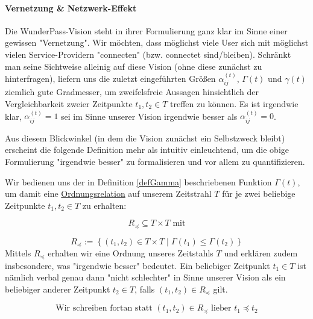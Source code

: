 \documentclass[11pt]{scrartcl}
\begin{document}
\paragraph{Vernetzung \& Netzwerk-Effekt}
\label{sec:zahlen_status_quo_netzwerk_effekt}

\textrm{ }
\vspace{0.3cm}

Die WunderPass-Vision steht in ihrer Formulierung ganz klar im Sinne einer gewissen "Vernetzung". Wir möchten, dass möglichst viele User sich mit möglichst vielen Service-Providern "connecten" (bzw. connectet sind/bleiben). Schränkt man seine Sichtweise alleinig auf diese Vision (ohne diese zunächst zu hinterfragen), liefern uns die zuletzt eingeführten Größen $\alpha^{(t)}_{ij}$, $\Gamma(t)$ und $\gamma(t)$ ziemlich gute Gradmesser, um zweifelsfreie Aussagen hinsichtlich der Vergleichbarkeit zweier Zeitpunkte $t_1, t_2 \in T$ treffen zu können. Es ist irgendwie klar, $\alpha^{(t)}_{ij} = 1$ sei im Sinne unserer Vision irgendwie besser als $\alpha^{(t)}_{ij} = 0$.

Aus diesem Blickwinkel (in dem die Vision zunächst ein Selbstzweck bleibt) erscheint die folgende Definition mehr als intuitiv einleuchtend, um die obige Formulierung "irgendwie besser" zu formalisieren und vor allem zu quantifizieren. 

\vspace{0.3cm}

\begin{Def}\label{defRelation}

Wir bedienen uns der in Definition \ref{defGamma} beschriebenen Funktion $\Gamma(t)$, um damit eine \href{https://de.wikipedia.org/wiki/Ordnungsrelation}{Ordnungsrelation} 
auf unserem Zeitstrahl $T$ für je zwei beliebige Zeitpunkte $t_1, t_2 \in T$ zu erhalten: 

\vspace{0.3cm}

\begin{equation*}
  R_{\preceq} \subseteq T \times T \textrm{ mit}
\end{equation*}

\begin{equation*}
  R_{\preceq}:= \left\{ (t_1, t_2) \in T \times T \mid \Gamma(t_1) \leq \Gamma(t_2) \right\}
\end{equation*}
\vspace{1cm}
Mittels $R_{\preceq}$ erhalten wir eine Ordnung unseres Zeitstahls $T$ und erklären zudem insbesondere, was "irgendwie besser" bedeutet. Ein beliebiger Zeitpunkt $t_1 \in T$ ist nämlich verbal genau dann "nicht schlechter" in Sinne unserer Vision als ein beliebiger anderer Zeitpunkt $t_2 \in T$, falls $(t_1, t_2) \in R_{\preceq}$ gilt.

\vspace{0.3cm}

\begin{equation*}
  \textrm{Wir schreiben fortan statt } (t_1, t_2) \in R_{\preceq} \textrm{ lieber } t_1 \preceq t_2 
\end{equation*}

\end{Def}
\end{document}

